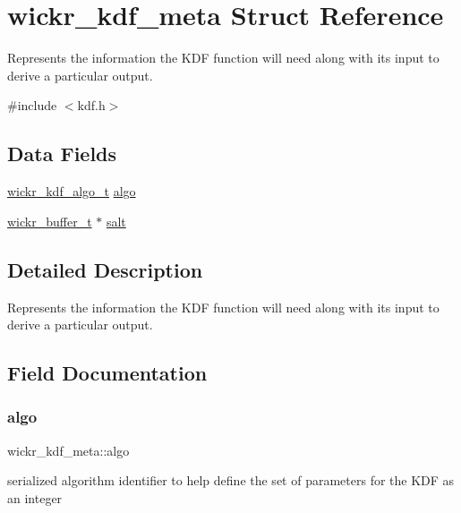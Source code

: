 \hypertarget{structwickr__kdf__meta}{}\section{wickr\+\_\+kdf\+\_\+meta Struct Reference}
\label{structwickr__kdf__meta}


Represents the information the K\+DF function will need along with it\textquotesingle{}s input to derive a particular output.  




{\ttfamily \#include $<$kdf.\+h$>$}

\subsection*{Data Fields}
\begin{DoxyCompactItemize}
\item 
\hyperlink{structwickr__kdf__algo}{wickr\+\_\+kdf\+\_\+algo\+\_\+t} \hyperlink{structwickr__kdf__meta_a263e1f7c77447a5a2a57c0d5d2f4ee34}{algo}
\item 
\hyperlink{structwickr__buffer}{wickr\+\_\+buffer\+\_\+t} $\ast$ \hyperlink{structwickr__kdf__meta_a315c54ee4578a01266a4e7352a52d459}{salt}
\end{DoxyCompactItemize}


\subsection{Detailed Description}
Represents the information the K\+DF function will need along with it\textquotesingle{}s input to derive a particular output. 

\subsection{Field Documentation}
\mbox{\label{structwickr__kdf__meta_a263e1f7c77447a5a2a57c0d5d2f4ee34}} 
\subsubsection{\texorpdfstring{algo}{algo}}
{\footnotesize\ttfamily wickr\+\_\+kdf\+\_\+meta\+::algo}

serialized algorithm identifier to help define the set of parameters for the K\+DF as an integer \mbox{\label{structwickr__kdf__meta_a315c54ee4578a01266a4e7352a52d459}} 

